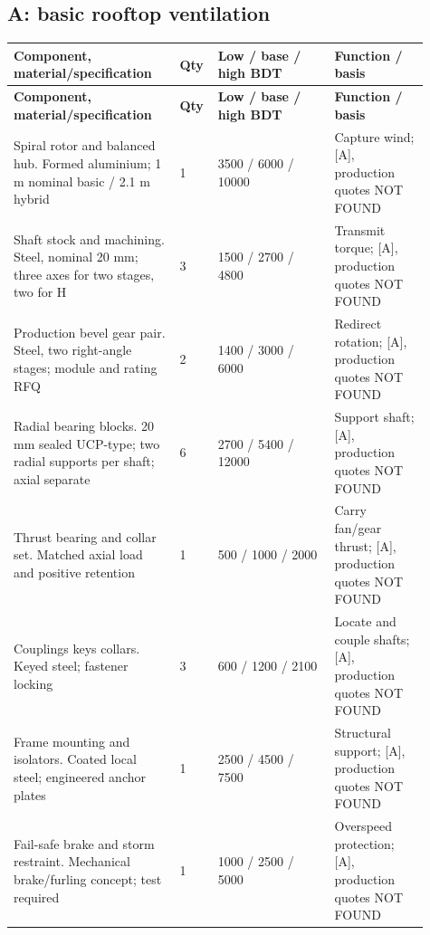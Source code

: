 \documentclass[11pt,a4paper]{article}
\begin{document}
\subsection{A: basic rooftop ventilation}
{\footnotesize
\setlength{\tabcolsep}{3pt}\renewcommand{\arraystretch}{1.18}
\begin{longtable}{@{}>{\raggedright\arraybackslash}p{0.3784\linewidth}>{\raggedright\arraybackslash}p{0.0541\linewidth}>{\raggedright\arraybackslash}p{0.2613\linewidth}>{\raggedright\arraybackslash}p{0.2162\linewidth}@{}}
\toprule \textbf{Component, material/specification} & \textbf{Qty} & \textbf{Low / base / high BDT} & \textbf{Function / basis} \\ \midrule
\endfirsthead\toprule \textbf{Component, material/specification} & \textbf{Qty} & \textbf{Low / base / high BDT} & \textbf{Function / basis} \\ \midrule
\endhead\bottomrule\endfoot
Spiral rotor and balanced hub. Formed aluminium; 1 m nominal basic / 2.1 m hybrid & \num{1} & \num{3500} / \num{6000} / \num{10000} & Capture wind; [A], production quotes NOT FOUND \\
Shaft stock and machining. Steel, nominal 20 mm; three axes for two stages, two for H & \num{3} & \num{1500} / \num{2700} / \num{4800} & Transmit torque; [A], production quotes NOT FOUND \\
Production bevel gear pair. Steel, two right-angle stages; module and rating RFQ & \num{2} & \num{1400} / \num{3000} / \num{6000} & Redirect rotation; [A], production quotes NOT FOUND \\
Radial bearing blocks. 20 mm sealed UCP-type; two radial supports per shaft; axial separate & \num{6} & \num{2700} / \num{5400} / \num{12000} & Support shaft; [A], production quotes NOT FOUND \\
Thrust bearing and collar set. Matched axial load and positive retention & \num{1} & \num{500} / \num{1000} / \num{2000} & Carry fan/gear thrust; [A], production quotes NOT FOUND \\
Couplings keys collars. Keyed steel; fastener locking & \num{3} & \num{600} / \num{1200} / \num{2100} & Locate and couple shafts; [A], production quotes NOT FOUND \\
Frame mounting and isolators. Coated local steel; engineered anchor plates & \num{1} & \num{2500} / \num{4500} / \num{7500} & Structural support; [A], production quotes NOT FOUND \\
Fail-safe brake and storm restraint. Mechanical brake/furling concept; test required & \num{1} & \num{1000} / \num{2500} / \num{5000} & Overspeed protection; [A], production quotes NOT FOUND \\

\end{longtable}}
\end{document}
